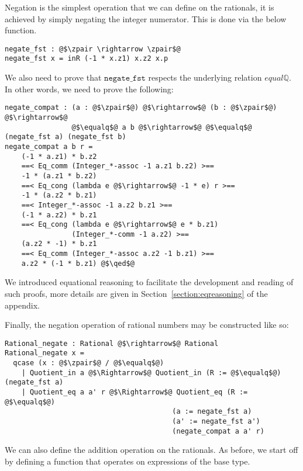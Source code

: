\documentclass[12pt,twoside,maitrise]{dms}
\theoremstyle{definition}
\numberwithin{equation}{section}
\numberwithin{table}{chapter}
\numberwithin{figure}{chapter}
\newcommand\id[1] {\texttt{#1}}
\renewcommand\qed{\blacksquare}
\begin{document}
Negation is the simplest operation that we can define on the rationals, it is
achieved by simply negating the integer numerator. This is done via the below
function.

\begin{verbatim}
negate_fst : @$\zpair \rightarrow \zpair$@
negate_fst x = inR (-1 * x.z1) x.z2 x.p
\end{verbatim}

We also need to prove that $\id{negate\_fst}$ respects the underlying relation
$equal\mathbb{Q}$. In other words, we need to prove the following:

\begin{verbatim}
negate_compat : (a : @$\zpair$@) @$\rightarrow$@ (b : @$\zpair$@) @$\rightarrow$@
                @$\equalq$@ a b @$\rightarrow$@ @$\equalq$@ (negate_fst a) (negate_fst b)
negate_compat a b r =
    (-1 * a.z1) * b.z2
    ==< Eq_comm (Integer_*-assoc -1 a.z1 b.z2) >==
    -1 * (a.z1 * b.z2)
    ==< Eq_cong (lambda e @$\rightarrow$@ -1 * e) r >==
    -1 * (a.z2 * b.z1)
    ==< Integer_*-assoc -1 a.z2 b.z1 >==
    (-1 * a.z2) * b.z1
    ==< Eq_cong (lambda e @$\rightarrow$@ e * b.z1)
                (Integer_*-comm -1 a.z2) >==
    (a.z2 * -1) * b.z1
    ==< Eq_comm (Integer_*-assoc a.z2 -1 b.z1) >==
    a.z2 * (-1 * b.z1) @$\qed$@
\end{verbatim}

We introduced equational reasoning to facilitate the development and reading of
such proofs, more details are given in Section~\ref{section:eqreasoning} of the
appendix.

Finally, the negation operation of rational numbers may be constructed like so:

\begin{verbatim}
Rational_negate : Rational @$\rightarrow$@ Rational
Rational_negate x =
  qcase (x : @$\zpair$@ / @$\equalq$@)
    | Quotient_in a @$\Rightarrow$@ Quotient_in (R := @$\equalq$@) (negate_fst a)
    | Quotient_eq a a' r @$\Rightarrow$@ Quotient_eq (R := @$\equalq$@)
                                        (a := negate_fst a)
                                        (a' := negate_fst a')
                                        (negate_compat a a' r)
\end{verbatim}

We can also define the addition operation on the rationals. As before, we start
off by defining a function that operates on expressions of the base type.
\end{document}
